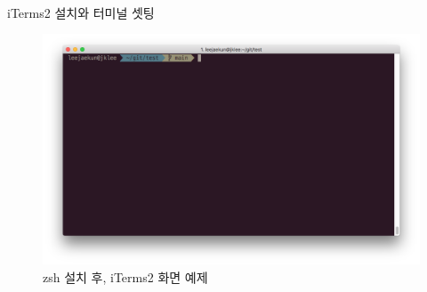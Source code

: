  \newpage
 \noindent \href{https://www.yalco.kr/lectures/git-github/}\textbf{\color{blue}{얄코 강좌}} \\
 iTerms2 설치와 터미널 셋팅 \\
\begin{figure} [!htbp] %
	\centering
	\captionsetup{justification=centering,margin=0.5cm}
	\includegraphics[width=0.7\linewidth]{./fig/zsh-iTerms2.png}
	\caption{zsh 설치 후, iTerms2 화면 예제}
	\label{fig:iTerms2}
\end{figure} 
%
 
 
 
